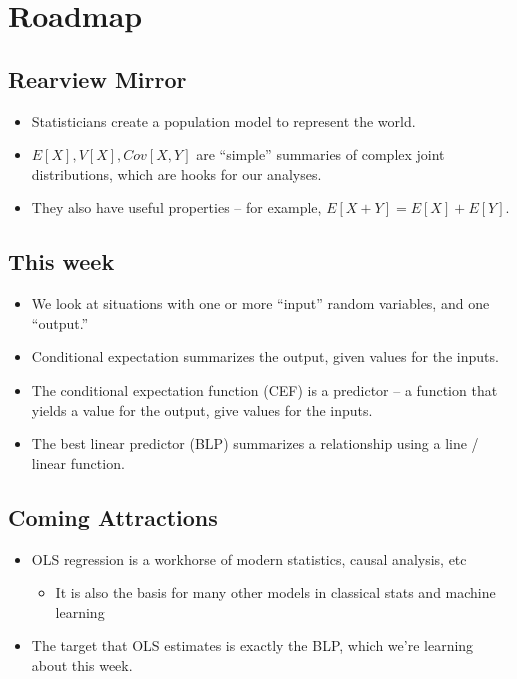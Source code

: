 \documentclass[
]{book}
\providecommand{\tightlist}{%
  \setlength{\itemsep}{0pt}\setlength{\parskip}{0pt}}
\theoremstyle{definition}
\theoremstyle{definition}
\theoremstyle{definition}
\theoremstyle{definition}
\theoremstyle{remark}
\begin{document}
\hypertarget{roadmap}{%
\section{Roadmap}\label{roadmap}}

\hypertarget{rearview-mirror}{%
\subsection{Rearview Mirror}\label{rearview-mirror}}

\begin{itemize}
\tightlist
\item
  Statisticians create a population model to represent the world.
\item
  \(E[X], V[X], Cov[X,Y]\) are ``simple'' summaries of complex joint distributions, which are hooks for our analyses.
\item
  They also have useful properties -- for example, \(E[X + Y] = E[X] + E[Y]\).
\end{itemize}

\hypertarget{this-week}{%
\subsection{This week}\label{this-week}}

\begin{itemize}
\tightlist
\item
  We look at situations with one or more ``input'' random variables, and one ``output.''
\item
  Conditional expectation summarizes the output, given values for the inputs.
\item
  The conditional expectation function (CEF) is a predictor -- a function that yields a value for the output, give values for the inputs.
\item
  The best linear predictor (BLP) summarizes a relationship using a line / linear function.
\end{itemize}

\hypertarget{coming-attractions}{%
\subsection{Coming Attractions}\label{coming-attractions}}

\begin{itemize}
\tightlist
\item
  OLS regression is a workhorse of modern statistics, causal analysis, etc

  \begin{itemize}
  \tightlist
  \item
    It is also the basis for many other models in classical stats and machine learning
  \end{itemize}
\item
  The target that OLS estimates is exactly the BLP, which we're learning about this week.
\end{itemize}
\end{document}
